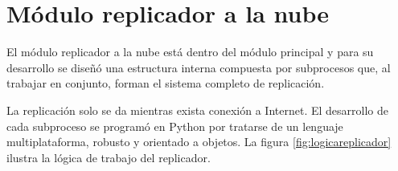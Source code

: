 








\section{Módulo replicador a la nube}

El módulo replicador a la nube está dentro del módulo principal y para su desarrollo se diseñó una estructura interna compuesta por subprocesos que, al trabajar en conjunto, forman el sistema completo de replicación.

La replicación solo se da mientras exista conexión a Internet. El desarrollo de cada subproceso se programó en Python por tratarse de un lenguaje multiplataforma, robusto y orientado a objetos. La figura \ref{fig:logicareplicador} ilustra la lógica de trabajo del replicador.





